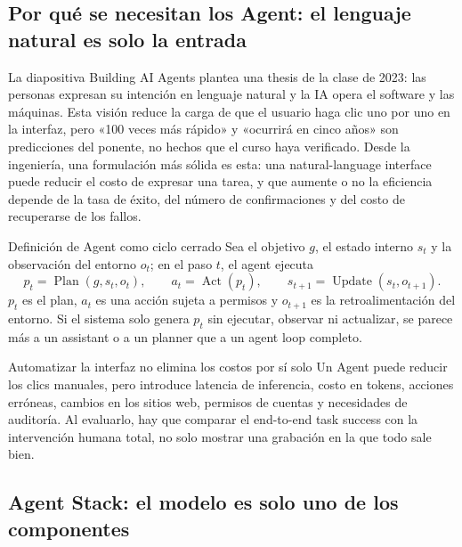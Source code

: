 \subsection{Por qué se necesitan los Agent: el lenguaje natural es solo la entrada}

La diapositiva Building AI Agents plantea una thesis de la clase de 2023: las personas expresan su intención en lenguaje natural y la IA opera el software y las máquinas. Esta visión reduce la carga de que el usuario haga clic uno por uno en la interfaz, pero «100 veces más rápido» y «ocurrirá en cinco años» son predicciones del ponente, no hechos que el curso haya verificado. Desde la ingeniería, una formulación más sólida es esta: una natural-language interface puede reducir el costo de expresar una tarea, y que aumente o no la eficiencia depende de la tasa de éxito, del número de confirmaciones y del costo de recuperarse de los fallos.


\begin{importantbox}{Definición de Agent como ciclo cerrado}
Sea el objetivo $g$, el estado interno $s_t$ y la observación del entorno $o_t$; en el paso $t$, el agent ejecuta
\[
p_t=\operatorname{Plan}(g,s_t,o_t),\qquad
a_t=\operatorname{Act}(p_t),\qquad
s_{t+1}=\operatorname{Update}(s_t,o_{t+1}).
\]
$p_t$ es el plan, $a_t$ es una acción sujeta a permisos y $o_{t+1}$ es la retroalimentación del entorno. Si el sistema solo genera $p_t$ sin ejecutar, observar ni actualizar, se parece más a un assistant o a un planner que a un agent loop completo.
\end{importantbox}

\begin{warningbox}{Automatizar la interfaz no elimina los costos por sí solo}
Un Agent puede reducir los clics manuales, pero introduce latencia de inferencia, costo en tokens, acciones erróneas, cambios en los sitios web, permisos de cuentas y necesidades de auditoría. Al evaluarlo, hay que comparar el end-to-end task success con la intervención humana total, no solo mostrar una grabación en la que todo sale bien.
\end{warningbox}

\subsection{Agent Stack: el modelo es solo uno de los componentes}

